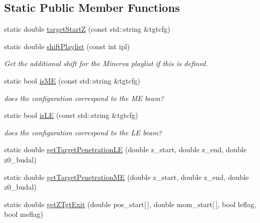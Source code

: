 \subsection*{Static Public Member Functions}
\begin{DoxyCompactItemize}
\item 
static double \hyperlink{class_neutrino_flux_reweight_1_1_target_attenuation_reweighter_abc3651ca760b302a9eb1590e2a2abcc7}{target\-Start\-Z} (const std\-::string \&tgtcfg)
\item 
static double \hyperlink{class_neutrino_flux_reweight_1_1_target_attenuation_reweighter_abffb4bb0215666bf54f96a561f6fbcde}{shift\-Playlist} (const int ipl)
\begin{DoxyCompactList}\small\item\em Get the additional shift for the Minerva playlist if this is defined. \end{DoxyCompactList}\item 
static bool \hyperlink{class_neutrino_flux_reweight_1_1_target_attenuation_reweighter_a92d081ff9e771a79919287fba68b7a94}{is\-M\-E} (const std\-::string \&tgtcfg)
\begin{DoxyCompactList}\small\item\em does the configuration correspond to the M\-E beam? \end{DoxyCompactList}\item 
static bool \hyperlink{class_neutrino_flux_reweight_1_1_target_attenuation_reweighter_a675884a2ca166868e55bb1d6c2eac321}{is\-L\-E} (const std\-::string \&tgtcfg)
\begin{DoxyCompactList}\small\item\em does the configuration correspond to the L\-E beam? \end{DoxyCompactList}\item 
static double \hyperlink{class_neutrino_flux_reweight_1_1_target_attenuation_reweighter_a456b05db5e17fef740619e47c18eabcf}{get\-Target\-Penetration\-L\-E} (double z\-\_\-start, double z\-\_\-end, double z0\-\_\-budal)
\item 
static double \hyperlink{class_neutrino_flux_reweight_1_1_target_attenuation_reweighter_a69653c6ab68bdf8836d80a302cb818c1}{get\-Target\-Penetration\-M\-E} (double z\-\_\-start, double z\-\_\-end, double z0\-\_\-budal)
\item 
static double \hyperlink{class_neutrino_flux_reweight_1_1_target_attenuation_reweighter_a1e7273b417c1013b777ab3532da5ef5e}{get\-Z\-Tgt\-Exit} (double pos\-\_\-start\mbox{[}$\,$\mbox{]}, double mom\-\_\-start\mbox{[}$\,$\mbox{]}, bool leflag, bool meflag)
\end{DoxyCompactItemize}
